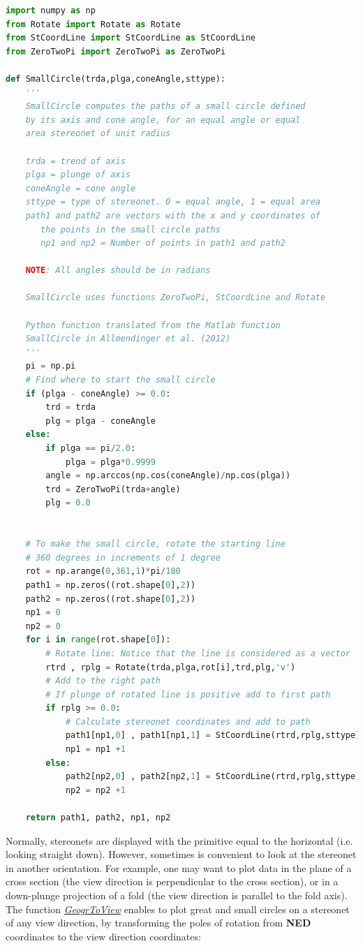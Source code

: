 \documentclass[a4paper , 12pt]{book}
\begin{document}
\begin{lstlisting}[language=Python, frame=single]
import numpy as np
from Rotate import Rotate as Rotate
from StCoordLine import StCoordLine as StCoordLine
from ZeroTwoPi import ZeroTwoPi as ZeroTwoPi

def SmallCircle(trda,plga,coneAngle,sttype):
    '''
	SmallCircle computes the paths of a small circle defined 
	by its axis and cone angle, for an equal angle or equal 
	area stereonet of unit radius
	
	trda = trend of axis
	plga = plunge of axis
	coneAngle = cone angle
	sttype = type of stereonet. 0 = equal angle, 1 = equal area
	path1 and path2 are vectors with the x and y coordinates of 
       the points in the small circle paths
       np1 and np2 = Number of points in path1 and path2
       
    NOTE: All angles should be in radians

	SmallCircle uses functions ZeroTwoPi, StCoordLine and Rotate

	Python function translated from the Matlab function 	
	SmallCircle in Allmendinger et al. (2012)
	'''
    pi = np.pi
	# Find where to start the small circle
    if (plga - coneAngle) >= 0.0:
        trd = trda
        plg = plga - coneAngle
    else:
        if plga == pi/2.0:
            plga = plga*0.9999
        angle = np.arccos(np.cos(coneAngle)/np.cos(plga))
        trd = ZeroTwoPi(trda+angle)
        plg = 0.0
    
    
	# To make the small circle, rotate the starting line 
	# 360 degrees in increments of 1 degree
    rot = np.arange(0,361,1)*pi/180
    path1 = np.zeros((rot.shape[0],2))
    path2 = np.zeros((rot.shape[0],2))
    np1 = 0
    np2 = 0
    for i in range(rot.shape[0]):
        # Rotate line: Notice that the line is considered as a vector
        rtrd , rplg = Rotate(trda,plga,rot[i],trd,plg,'v')
        # Add to the right path
        # If plunge of rotated line is positive add to first path
        if rplg >= 0.0:
            # Calculate stereonet coordinates and add to path
            path1[np1,0] , path1[np1,1] = StCoordLine(rtrd,rplg,sttype)
            np1 = np1 +1
        else:
            path2[np2,0] , path2[np2,1] = StCoordLine(rtrd,rplg,sttype)
            np2 = np2 +1
    
    return path1, path2, np1, np2
\end{lstlisting}

Normally, stereonets are displayed with the primitive equal to the horizontal (i.e. looking straight down). However, sometimes is convenient to look at the stereonet in another orientation. For example, one may want to plot data in the plane of a cross section (the view direction is perpendicular to the cross section), or in a down-plunge projection of a fold (the view direction is parallel to the fold axis). The function \href{https://github.com/nfcd/compGeo/blob/master/source/functions/GeogrToView.py}{\textit{GeogrToView}} enables to plot great and small circles on a stereonet of any view direction, by transforming the poles of rotation from \textbf{NED} coordinates to the view direction coordinates:
\end{document}
